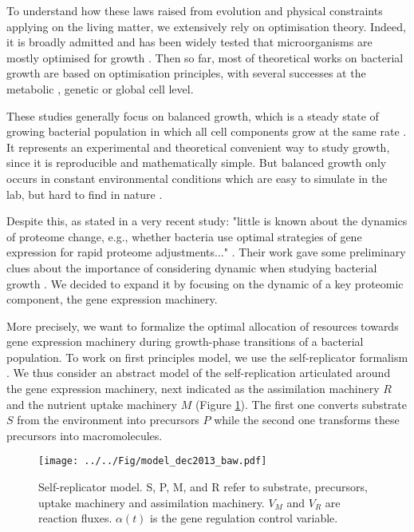 \documentclass[a4paper, 10pt, conference]{ieeeconf}      %
\begin{document}
To understand how these laws raised from evolution and physical constraints applying on the living matter, we extensively rely on optimisation theory.
Indeed, it is broadly admitted and has been widely tested that microorganisms are mostly optimised for growth \cite{dekel_optimality_2005}.
Then so far, most of theoretical works on bacterial growth are based on optimisation principles, with several successes at the metabolic \cite{edwards_escherichia_2000}, genetic \cite{molenaar_shifts_2009} or global cell level.

These studies generally focus on balanced growth, which is a steady state of growing bacterial population in which all cell components grow at the same rate \cite{pavlov_optimal_2013}.
It represents an experimental and theoretical convenient way to study growth, since it is reproducible and mathematically simple.
But balanced growth only occurs in constant environmental conditions which are easy to simulate in the lab, but hard to find in nature \cite{neidhardt_physiology_1990}.

Despite this, as stated in a very recent study: "little is known about the dynamics of proteome change, e.g., whether bacteria use optimal strategies of gene expression for rapid proteome adjustments..." \cite{pavlov_optimal_2013}.
Their work gave some preliminary clues about the importance of considering dynamic when studying bacterial growth \cite{pavlov_optimal_2013, ehrenberg_medium-dependent_2013}.
We decided to expand it by focusing on the dynamic of a key proteomic component, the gene expression machinery.

More precisely, we want to formalize the optimal allocation of resources towards gene expression machinery during growth-phase transitions of a bacterial population.
To work on first principles model, we use the self-replicator formalism \cite{molenaar_shifts_2009}.
We thus consider an abstract model of the self-replication articulated around the gene expression machinery, next indicated as the assimilation machinery $R$ and the nutrient uptake machinery $M$ (Figure \ref{fig::selfrep}). The first one converts substrate $S$ from the environment into precursors $P$ while the second one transforms these precursors into macromolecules.
\begin{figure}[h]
\centering
\texttt{[image: ../../Fig/model\_dec2013\_baw.pdf]}
\caption{Self-replicator model. S, P, M, and R refer to substrate, precursors, uptake machinery and assimilation machinery.
$V_M$ and $V_R$ are reaction fluxes.
$\alpha(t)$ is the gene regulation control variable.}
\label{fig::selfrep}
\end{figure}
\end{document}
